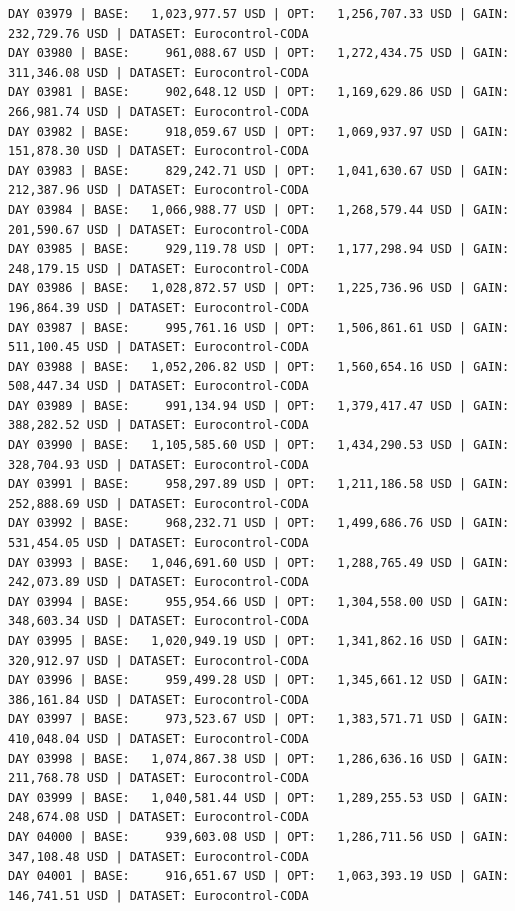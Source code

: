 \documentclass[11pt,a4paper]{article}
\begin{document}
\begin{verbatim}
DAY 03979 | BASE:   1,023,977.57 USD | OPT:   1,256,707.33 USD | GAIN: 232,729.76 USD | DATASET: Eurocontrol-CODA
DAY 03980 | BASE:     961,088.67 USD | OPT:   1,272,434.75 USD | GAIN: 311,346.08 USD | DATASET: Eurocontrol-CODA
DAY 03981 | BASE:     902,648.12 USD | OPT:   1,169,629.86 USD | GAIN: 266,981.74 USD | DATASET: Eurocontrol-CODA
DAY 03982 | BASE:     918,059.67 USD | OPT:   1,069,937.97 USD | GAIN: 151,878.30 USD | DATASET: Eurocontrol-CODA
DAY 03983 | BASE:     829,242.71 USD | OPT:   1,041,630.67 USD | GAIN: 212,387.96 USD | DATASET: Eurocontrol-CODA
DAY 03984 | BASE:   1,066,988.77 USD | OPT:   1,268,579.44 USD | GAIN: 201,590.67 USD | DATASET: Eurocontrol-CODA
DAY 03985 | BASE:     929,119.78 USD | OPT:   1,177,298.94 USD | GAIN: 248,179.15 USD | DATASET: Eurocontrol-CODA
DAY 03986 | BASE:   1,028,872.57 USD | OPT:   1,225,736.96 USD | GAIN: 196,864.39 USD | DATASET: Eurocontrol-CODA
DAY 03987 | BASE:     995,761.16 USD | OPT:   1,506,861.61 USD | GAIN: 511,100.45 USD | DATASET: Eurocontrol-CODA
DAY 03988 | BASE:   1,052,206.82 USD | OPT:   1,560,654.16 USD | GAIN: 508,447.34 USD | DATASET: Eurocontrol-CODA
DAY 03989 | BASE:     991,134.94 USD | OPT:   1,379,417.47 USD | GAIN: 388,282.52 USD | DATASET: Eurocontrol-CODA
DAY 03990 | BASE:   1,105,585.60 USD | OPT:   1,434,290.53 USD | GAIN: 328,704.93 USD | DATASET: Eurocontrol-CODA
DAY 03991 | BASE:     958,297.89 USD | OPT:   1,211,186.58 USD | GAIN: 252,888.69 USD | DATASET: Eurocontrol-CODA
DAY 03992 | BASE:     968,232.71 USD | OPT:   1,499,686.76 USD | GAIN: 531,454.05 USD | DATASET: Eurocontrol-CODA
DAY 03993 | BASE:   1,046,691.60 USD | OPT:   1,288,765.49 USD | GAIN: 242,073.89 USD | DATASET: Eurocontrol-CODA
DAY 03994 | BASE:     955,954.66 USD | OPT:   1,304,558.00 USD | GAIN: 348,603.34 USD | DATASET: Eurocontrol-CODA
DAY 03995 | BASE:   1,020,949.19 USD | OPT:   1,341,862.16 USD | GAIN: 320,912.97 USD | DATASET: Eurocontrol-CODA
DAY 03996 | BASE:     959,499.28 USD | OPT:   1,345,661.12 USD | GAIN: 386,161.84 USD | DATASET: Eurocontrol-CODA
DAY 03997 | BASE:     973,523.67 USD | OPT:   1,383,571.71 USD | GAIN: 410,048.04 USD | DATASET: Eurocontrol-CODA
DAY 03998 | BASE:   1,074,867.38 USD | OPT:   1,286,636.16 USD | GAIN: 211,768.78 USD | DATASET: Eurocontrol-CODA
DAY 03999 | BASE:   1,040,581.44 USD | OPT:   1,289,255.53 USD | GAIN: 248,674.08 USD | DATASET: Eurocontrol-CODA
DAY 04000 | BASE:     939,603.08 USD | OPT:   1,286,711.56 USD | GAIN: 347,108.48 USD | DATASET: Eurocontrol-CODA
DAY 04001 | BASE:     916,651.67 USD | OPT:   1,063,393.19 USD | GAIN: 146,741.51 USD | DATASET: Eurocontrol-CODA

\end{verbatim}
\end{document}
